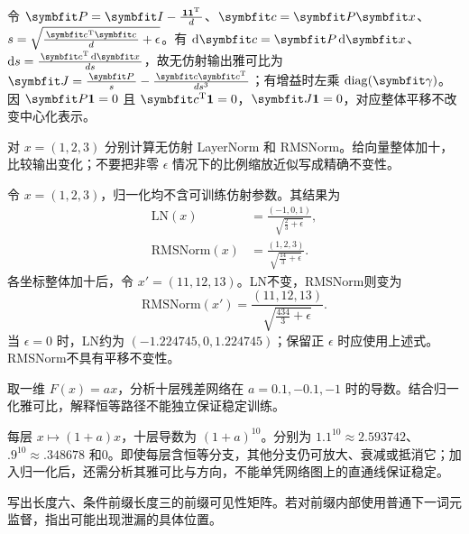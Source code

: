 \begin{exercises}
\begin{exercise}
\begin{solution}
令 $\mat{P}=\mat{I}-\frac{\mathbf1\mathbf1^{\mathrm{T}}}{d}$、$\vect{c}=\mat{P}\vect{x}$、$s=\sqrt{\frac{\vect{c}^{\mathrm{T}}\vect{c}}{d}+\epsilon}$。有 $\dif \vect{c}=\mat{P}\dif \vect{x}$、$\dif s=\frac{\vect{c}^{\mathrm{T}}\dif \vect{x}}{ds}$，故无仿射输出雅可比为 $\mat{J}=\frac{\mat{P}}{s}-\frac{\vect{c}\vect{c}^{\mathrm{T}}}{ds^3}$；有增益时左乘 $\operatorname{diag}(\vect{\gamma})$。因 $\mat{P}\mathbf1=0$ 且 $\vect{c}^{\mathrm{T}}\mathbf1=0$，$\mat{J}\mathbf1=0$，对应整体平移不改变中心化表示。
\end{solution}
\end{exercise}

\begin{exercise} 对 $x=(1,2,3)$ 分别计算无仿射 LayerNorm 和 RMSNorm。给向量整体加十，比较输出变化；不要把非零 $\epsilon$ 情况下的比例缩放近似写成精确不变性。

\begin{solution}
令 $x=(1,2,3)$，归一化均不含可训练仿射参数。其结果为
\[
\begin{aligned}
\mathrm{LN}(x)&=\frac{(-1,0,1)}{\sqrt{\frac{2}{3}+\epsilon}},\\
\mathrm{RMSNorm}(x)&=\frac{(1,2,3)}{\sqrt{\frac{14}{3}+\epsilon}}.
\end{aligned}
\]
各坐标整体加十后，令 $x'=(11,12,13)$。LN不变，RMSNorm则变为
\[
\mathrm{RMSNorm}(x')=\frac{(11,12,13)}{\sqrt{\frac{434}{3}+\epsilon}}.
\]
当 $\epsilon=0$ 时，LN约为 $(-1.224745,0,1.224745)$；保留正 $\epsilon$ 时应使用上述式。RMSNorm不具有平移不变性。
\end{solution}
\end{exercise}

\begin{exercise} 取一维 $F(x)=ax$，分析十层残差网络在 $a=0.1,-0.1,-1$ 时的导数。结合归一化雅可比，解释恒等路径不能独立保证稳定训练。

\begin{solution}
每层 $x\mapsto(1+a)x$，十层导数为 $(1+a)^{10}$。分别为 $1.1^{10}\approx2.593742$、$.9^{10}\approx.348678$ 和0。即使每层含恒等分支，其他分支仍可放大、衰减或抵消它；加入归一化后，还需分析其雅可比与方向，不能单凭网络图上的直通线保证稳定。
\end{solution}
\end{exercise}

\begin{exercise} 写出长度六、条件前缀长度三的前缀可见性矩阵。若对前缀内部使用普通下一词元监督，指出可能出现泄漏的具体位置。


\end{exercise}
\end{exercises}
